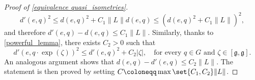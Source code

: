 \documentclass[a4paper,11pt,reqno]{amsart}
\theoremstyle{plain}
\theoremstyle{definition}
\newcommand{\g}{\mathfrak{g}}
\newcommand{\id}{e}
\newcommand{\coloneq}{\coloneqq}
\begin{document}
\begin{proof}[Proof of \cref{equivalence quasi_isometries}]
\begin{equation}
 d'(\id,q)^2 \le d(\id,q)^2 + C_1 \lVert L \rVert d(\id,q) \le (d(\id,q)^2 + C_1 \lVert L \rVert)^2,
\end{equation}
and therefore $d'(e,q) - d(e,q) \le C_1 \lVert L \rVert$.
Similarly, thanks to \cref{powerful_lemma}, there exists $C_2 > 0$ such that 
 \begin{equation*} 
 d'(e,q \cdot \exp(\zeta))^2 \le d'(e,q)^2 + C_2 \lvert \zeta \rvert, \quad \text{for every $q \in G$ and $\zeta \in [\g,\g]$.}
 \end{equation*}
 An analogous argument shows that $d(\id,q) - d'(\id,q) \le C_2 \lVert L \rVert$. The statement is then proved by setting $C \coloneq \max\set{C_1,C_2} \lVert L \rVert$.
\end{proof} 
\end{document}
